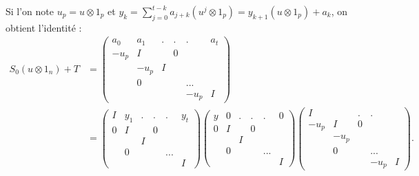 \begin{dem}
Si l'on note $u_p=u\otimes 1_p$ et $y_k=\sum_{j=0}^{t-k} a_{j+k}(u^j\otimes 1_p)=y_{k+1}(u\otimes 1_p)+a_k$, on obtient l'identité :
\begin{align*}
S_0(u\otimes 1_n)+T   &= 
\begin{pmatrix}                        a_0 & a_1        &  .  &.   &.      &   a_t     \\
				-u_p & I            &      & 0 &        &             \\
				        &   -u_p    & I    &    &        &               \\
				        &   0          &     &     & ...  &               \\
				        &               &     &    &-u_p & I 
\end{pmatrix}
\\ &= \begin{pmatrix}                    I & y_1   &  . &  .  &    .    &      y_t      \\
				0 & I       &     & 0  &        &		  \\
				   &         & I   &     &        &                    \\
				   &      0 &     &     & ...  &                      \\
				   &          &     &    &       & I
\end{pmatrix} 
\begin{pmatrix}y & 0 &  .&. &. &      0 \\
				0 & I &  & 0 & &		    \\
				 &       & I   &  &  &               \\
				&      0 &    &  & ... &        \\
				&      &     &    & & I   
\end{pmatrix}
\begin{pmatrix}                             I &                      &.    &.         &      \\
				-u_p & I                  & 0    &         &		    \\
				         &   -u_p           &     &          &               \\
				         &      0             &     & ...   &        \\
				         &                    &      &-u_p & I
\end{pmatrix}.
\end{align*}


\end{dem}
